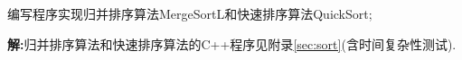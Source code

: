 \begin{problem}[习题3.1]
编写程序实现归并排序算法MergeSortL和快速排序算法QuickSort;
\end{problem}
\begin{solution}
\textbf{解:}归并排序算法和快速排序算法的C++程序见附录\ref{sec:sort}(含时间复杂性测试).
\end{solution}
